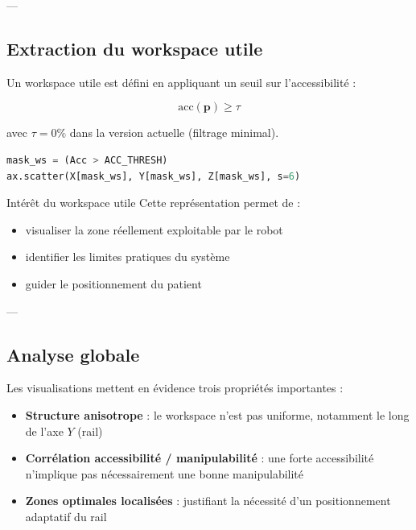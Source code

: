 \documentclass[11pt, a4paper]{article}
\begin{document}
---

\subsection{Extraction du workspace utile}

Un workspace utile est défini en appliquant un seuil sur l’accessibilité :

\begin{equation}
\mathrm{acc}(\mathbf{p}) \geq \tau
\end{equation}

avec $\tau = 0\%$ dans la version actuelle (filtrage minimal).

\begin{lstlisting}[language=python, caption={Extraction du workspace}]
mask_ws = (Acc > ACC_THRESH)
ax.scatter(X[mask_ws], Y[mask_ws], Z[mask_ws], s=6)
\end{lstlisting}

\begin{keybox}{Intérêt du workspace utile}
Cette représentation permet de :
\begin{itemize}
  \item visualiser la zone réellement exploitable par le robot
  \item identifier les limites pratiques du système
  \item guider le positionnement du patient
\end{itemize}
\end{keybox}

---

\subsection{Analyse globale}

Les visualisations mettent en évidence trois propriétés importantes :

\begin{itemize}
  \item \textbf{Structure anisotrope} : le workspace n’est pas uniforme, notamment le long de l’axe $Y$ (rail)
  \item \textbf{Corrélation accessibilité / manipulabilité} : une forte accessibilité n’implique pas nécessairement une bonne manipulabilité
  \item \textbf{Zones optimales localisées} : justifiant la nécessité d’un positionnement adaptatif du rail
\end{itemize}
\end{document}
